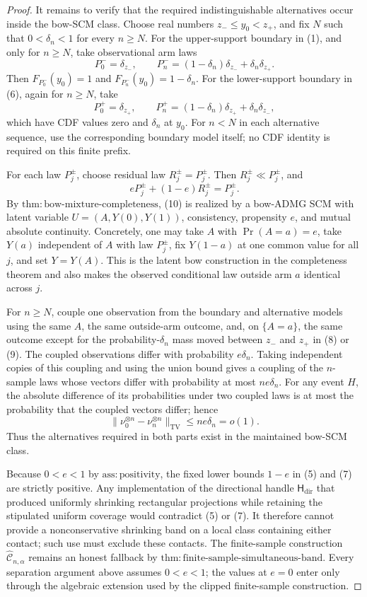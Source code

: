 \documentclass{article}
\begin{document}
\begin{proof}
It remains to verify that the required indistinguishable alternatives occur inside the bow-SCM class.  Choose real numbers \(z_-\le y_0<z_+\), and fix \(N\) such that \(0<\delta_n<1\) for every \(n\ge N\).  For the upper-support boundary in (1), and only for \(n\ge N\), take observational arm laws
\[
 P_0^- =\delta_{z_-},
 \qquad
 P_n^-=(1-\delta_n)\delta_{z_-}+\delta_n\delta_{z_+}. \tag{8}
\]
Then \(F_{P_0^-}(y_0)=1\) and \(F_{P_n^-}(y_0)=1-\delta_n\).  For the lower-support boundary in (6), again for \(n\ge N\), take
\[
 P_0^+=\delta_{z_+},
 \qquad
 P_n^+=(1-\delta_n)\delta_{z_+}+\delta_n\delta_{z_-}, \tag{9}
\]
which have CDF values zero and \(\delta_n\) at \(y_0\).  For \(n<N\) in each alternative sequence, use the corresponding boundary model itself; no CDF identity is required on this finite prefix.

For each law \(P_j^\pm\), choose residual law \(R_j^\pm=P_j^\pm\).  Then \(R_j^\pm\ll P_j^\pm\), and
\[
 eP_j^\pm+(1-e)R_j^\pm=P_j^\pm. \tag{10}
\]
By \(\mathrm{thm:bow\text{-}mixture\text{-}completeness}\), (10) is realized by a bow-ADMG SCM with latent variable \(U=(A,Y(0),Y(1))\), consistency, propensity \(e\), and mutual absolute continuity.  Concretely, one may take \(A\) with \(\Pr(A=a)=e\), take \(Y(a)\) independent of \(A\) with law \(P_j^\pm\), fix \(Y(1-a)\) at one common value for all \(j\), and set \(Y=Y(A)\).  This is the latent bow construction in the completeness theorem and also makes the observed conditional law outside arm \(a\) identical across \(j\).

For \(n\ge N\), couple one observation from the boundary and alternative models using the same \(A\), the same outside-arm outcome, and, on \(\{A=a\}\), the same outcome except for the probability-\(\delta_n\) mass moved between \(z_-\) and \(z_+\) in (8) or (9).  The coupled observations differ with probability \(e\delta_n\).  Taking independent copies of this coupling and using the union bound gives a coupling of the \(n\)-sample laws whose vectors differ with probability at most \(ne\delta_n\).  For any event \(H\), the absolute difference of its probabilities under two coupled laws is at most the probability that the coupled vectors differ; hence
\[
 \|\nu_0^{\otimes n}-\nu_n^{\otimes n}\|_{\mathrm{TV}}
 \le ne\delta_n=o(1). \tag{11}
\]
Thus the alternatives required in both parts exist in the maintained bow-SCM class.

Because \(0<e<1\) by \(\mathrm{ass:positivity}\), the fixed lower bounds \(1-e\) in (5) and (7) are strictly positive.  Any implementation of the directional handle \(\mathsf H_{\mathrm{dir}}\) that produced uniformly shrinking rectangular projections while retaining the stipulated uniform coverage would contradict (5) or (7).  It therefore cannot provide a nonconservative shrinking band on a local class containing either contact; such use must exclude these contacts.  The finite-sample construction \(\widehat{\mathcal C}_{n,\alpha}\) remains an honest fallback by \(\mathrm{thm:finite\text{-}sample\text{-}simultaneous\text{-}band}\).  Every separation argument above assumes \(0<e<1\); the values at \(e=0\) enter only through the algebraic extension used by the clipped finite-sample construction.
\end{proof}
\end{document}
